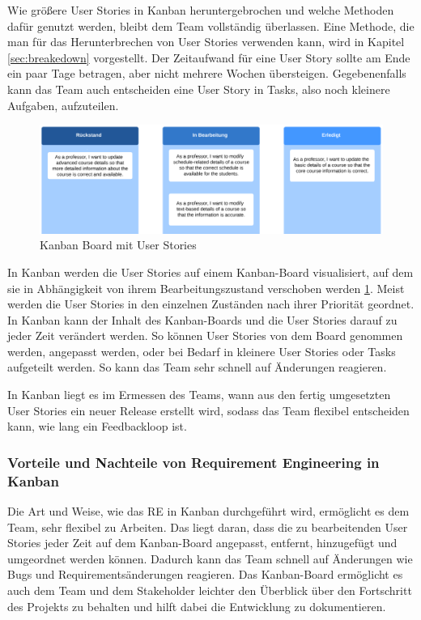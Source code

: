 \documentclass[acmtog]{acmart}
\begin{document}
Wie größere User Stories in Kanban heruntergebrochen und welche Methoden dafür genutzt werden, bleibt 
dem Team vollständig überlassen. Eine Methode, die man für das Herunterbrechen von User Stories verwenden 
kann, wird in Kapitel \ref{sec:breakedown} vorgestellt. Der Zeitaufwand für eine User Story sollte am Ende ein paar 
Tage betragen, aber nicht mehrere Wochen übersteigen. Gegebenenfalls kann das Team auch entscheiden 
eine User Story in Tasks, also noch kleinere Aufgaben, aufzuteilen. \cite{agileprocesses}

\begin{figure}[t]
  \centering
  \includegraphics[width=\linewidth]{images/Kanban-Board-mit-userstories.png}
  \caption{Kanban Board mit User Stories}
    \label{fig:kanban-board}
  \Description{}
\end{figure}

In Kanban werden die User Stories auf einem Kanban-Board visualisiert, auf dem sie in Abhängigkeit von 
ihrem Bearbeitungszustand verschoben werden \ref{fig:kanban-board}. Meist werden die User Stories in den einzelnen 
Zuständen nach ihrer Priorität geordnet. In Kanban kann der Inhalt des Kanban-Boards und die User Stories 
darauf zu jeder Zeit verändert werden. So können User Stories von dem Board genommen werden, angepasst 
werden, oder bei Bedarf in kleinere User Stories oder Tasks aufgeteilt werden. So kann das Team sehr schnell 
auf Änderungen reagieren. \cite{agileprocesses}

In Kanban liegt es im Ermessen des Teams, wann aus den fertig umgesetzten User Stories ein neuer Release 
erstellt wird, sodass das Team flexibel entscheiden kann, wie lang ein Feedbackloop ist. \cite{agileprocesses}

\subsubsection{Vorteile und Nachteile von Requirement Engineering in Kanban}

Die Art und Weise, wie das RE in Kanban durchgeführt wird, ermöglicht es dem Team, sehr flexibel zu Arbeiten. 
Das liegt daran, dass die zu bearbeitenden User Stories jeder Zeit auf dem Kanban-Board angepasst, entfernt, 
hinzugefügt und umgeordnet werden können. Dadurch kann das Team schnell auf Änderungen wie Bugs und Requirementsänderungen 
reagieren. Das Kanban-Board ermöglicht es auch dem Team und dem Stakeholder leichter den Überblick über den 
Fortschritt des Projekts zu behalten und hilft dabei die Entwicklung zu dokumentieren.
\end{document}
